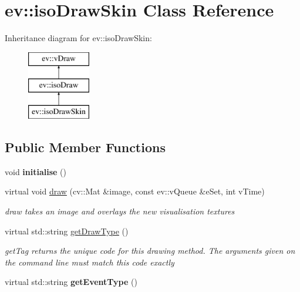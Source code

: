 \hypertarget{classev_1_1isoDrawSkin}{}\section{ev\+:\+:iso\+Draw\+Skin Class Reference}
\label{classev_1_1isoDrawSkin}
Inheritance diagram for ev\+:\+:iso\+Draw\+Skin\+:\begin{figure}[H]
\begin{center}
\leavevmode
\includegraphics[height=3.000000cm]{classev_1_1isoDrawSkin}
\end{center}
\end{figure}
\subsection*{Public Member Functions}
\begin{DoxyCompactItemize}
\item 
\mbox{\label{classev_1_1isoDrawSkin_a529da5b85b8c7e304baef5aa9e6a9d7b}} 
void {\bfseries initialise} ()
\item 
virtual void \hyperlink{classev_1_1isoDrawSkin_a2d4ed05b06bea443974f5b07a4d69374}{draw} (cv\+::\+Mat \&image, const ev\+::v\+Queue \&e\+Set, int v\+Time)
\begin{DoxyCompactList}\small\item\em draw takes an image and overlays the new visualisation textures \end{DoxyCompactList}\item 
virtual std\+::string \hyperlink{classev_1_1isoDrawSkin_a9f1bce77ba050a37dfe151e2246779bc}{get\+Draw\+Type} ()
\begin{DoxyCompactList}\small\item\em get\+Tag returns the unique code for this drawing method. The arguments given on the command line must match this code exactly \end{DoxyCompactList}\item 
\mbox{\label{classev_1_1isoDrawSkin_acb0ea9dac4dbb4e3802646cab7239c16}} 
virtual std\+::string {\bfseries get\+Event\+Type} ()
\end{DoxyCompactItemize}
